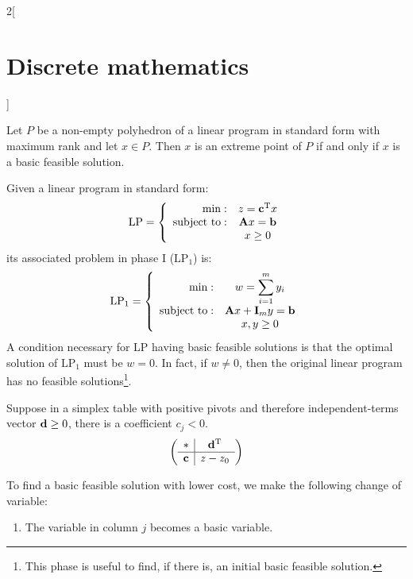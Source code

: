 \documentclass[../../../main.tex]{subfiles}
\begin{document}
\begin{multicols}{2}[\section{Discrete mathematics}]
\begin{prop}
    \end{prop}
    \begin{theorem}
        Let $P$ be a non-empty polyhedron of a linear program in standard form with maximum rank and let $x\in P$. Then $x$ is an extreme point of $P$ if and only if $x$ is a basic feasible solution.
    \end{theorem}
    \begin{definition}
        Given a linear program in standard form:
        $$\text{LP}=\left\{
            \begin{array}{rc}
                \min:              & z=\vb{c}^{\mathrm{T}}x             \\
                \text{subject to}: & \vb{A}x=\vb{b} \\
                                   & x\geq 0
            \end{array}\right.$$ its associated problem in phase I ($\text{LP}_1$) is: $$\text{LP}_1=\left\{\begin{array}{rc}
                \min:              & \displaystyle w=\sum_{i=1}^my_i               \\
                \text{subject to}: & \vb{A}x+\vb{I}_my=\vb{b} \\
                                   & x,y\geq 0
            \end{array}\right.$$
        A condition necessary for LP having basic feasible solutions is that the optimal solution of $\text{LP}_1$ must be $w=0$. In fact, if $w\ne 0$, then the original linear program has no feasible solutions\footnote{This phase is useful to find, if there is, an initial basic feasible solution.}.
    \end{definition}
    \begin{prop}
        Suppose in a simplex table with positive pivots and therefore independent-terms vector $\vb{d}\geq 0$, there is a coefficient $c_j<0$. $$\left(\begin{array}{c|c}
                    *             & \vb{d}^{\mathrm{T}} \\
                    \hline
                    \vb{c} & z-z_0
                \end{array}\right)$$
    \end{prop}
    To find a basic feasible solution with lower cost, we make the following change of variable:
    \begin{enumerate}
        \item The variable in column $j$ becomes a basic variable.

\end{enumerate}
\end{multicols}
\end{document}
